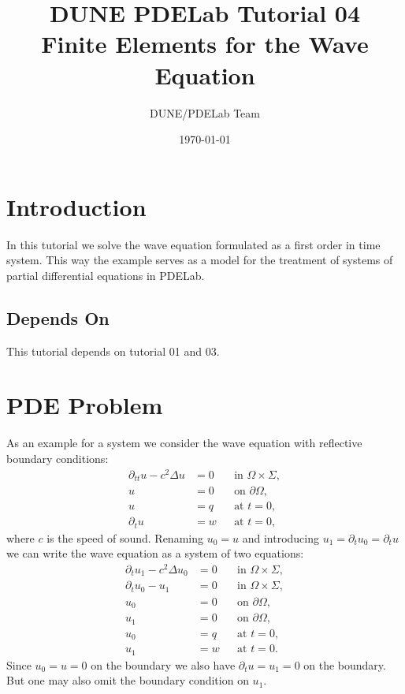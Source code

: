 \documentclass[a4paper,12pt]{article}
\title{DUNE PDELab Tutorial 04 \\ 
Finite Elements for the Wave Equation}
\author{DUNE/PDELab Team}
\date{\today}
\begin{document}
\maketitle
\tableofcontents
\clearpage

\section{Introduction}

In this tutorial we solve the wave equation formulated as a first order
in time system. This way the example serves as a model for the 
treatment of systems of partial differential equations in PDELab.

\subsection*{Depends On} This tutorial depends on tutorial 01 and 03.

\section{PDE Problem}

As an example for a system we consider the wave equation with reflective boundary conditions:
\begin{subequations}
\label{eq:WaveEquation}
\begin{align}
\partial_{tt} u-c^2\Delta u  &= 0 &&\text{in $\Omega\times\Sigma$},\\
u &= 0 &&\text{on $\partial\Omega$},\\
u &= q &&\text{at $t=0$},\\
\partial_t u &= w &&\text{at $t=0$},
\end{align}
\end{subequations}
where $c$ is the speed of sound.
Renaming $u_0=u$ and introducing $u_1=\partial_t u_0 =\partial_t u$ we can write the wave equation as a system of two equations:
\begin{subequations}
\label{eq:SystemForm1}
\begin{align}
\partial_t u_1 - c^2\Delta u_0 &=0 &&\text{in $\Omega\times\Sigma$}, \label{eq:2a}\\
\partial_t u_0 - u_1 &=0 &&\text{in $\Omega\times\Sigma$}, \label{eq:2b}\\
u_0 &= 0 &&\text{on $\partial\Omega$},\\
u_1 &= 0 &&\text{on $\partial\Omega$},\\
u_0 &= q &&\text{at $t=0$},\\
u_1 &= w &&\text{at $t=0$}.
\end{align}
\end{subequations}
Since $u_0=u=0$ on the boundary we also have $\partial_t u = u_1 = 0$ on the boundary.
But one may also omit the boundary condition on $u_1$.
\end{document}
